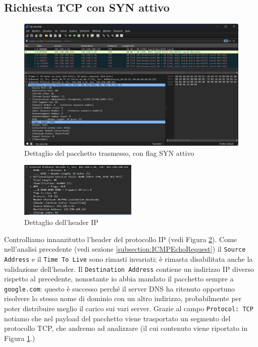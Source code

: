 \documentclass[12pt,a4paper]{report}
\begin{document}
\subsection{Richiesta TCP con SYN attivo}
\begin{figure}[H]
	\centering
	\includegraphics[width=1\textwidth]{tcp_syn_request}
 	\caption{Dettaglio del pacchetto trasmesso, con flag SYN attivo}
	\label{tcp_syn_request}
\end{figure}
\begin{figure}[H]
	\centering
	\includegraphics[width=0.5\textwidth]{tcp_syn_request_ip_layer}
 	\caption{Dettaglio dell'header IP}
	\label{tcp_syn_request_ip_layer}
\end{figure}
Controlliamo innanzitutto l'header del protocollo IP (vedi Figura \ref{tcp_syn_request_ip_layer}).
Come nell'analisi precedente (vedi sezione \ref{subsection:ICMPEchoRequest}) il \texttt{Source Address} e il \texttt{Time To Live} sono rimasti invariati; è rimasta disabilitata anche la validazione dell'header.
Il \texttt{Destination Address} contiene un indirizzo IP diverso rispetto al precedente, nonostante io abbia mandato il pacchetto sempre a \texttt{google.com}: questo è successo perché il server DNS ha ritenuto opportuno risolvere lo stesso nome di dominio con un altro indirizzo, probabilmente per poter distribuire meglio il carico sui vari server.
Grazie al campo \texttt{Protocol: TCP} notiamo che nel payload del pacchetto viene trasportato un segmento del protocollo TCP, che andremo ad analizzare (il cui contenuto viene riportato in Figura \ref{tcp_syn_request}.) \\
\end{document}
